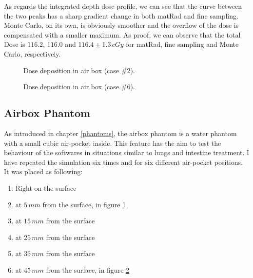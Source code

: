 \documentclass[12pt, a4paper, twoside]{book}
\begin{document}
As regards the integrated depth dose profile, we can see that the curve between the two peaks has a sharp gradient change in both matRad and fine sampling. Monte Carlo, on its own, is obviously smoother and the overflow of the dose is compensated with a smaller maximum. As proof, we can observe that the total Dose is $116.2$, $116.0$ and $116.4\pm1.3\,cGy$ for matRad, fine sampling and Monte Carlo, respectively.

\newpage

\begin{figure}[!t]
\centering
{}\quad
{}\quad
{}\quad
\caption{Dose deposition in air box (case \#2).}
\label{fig:AB2}
\end{figure}


\begin{figure}[!t]
\centering
{}\quad
{}\quad
{}\quad
\caption{Dose deposition in air box (case \#6).}
\label{fig:AB6}
\end{figure}

\subsection{Airbox Phantom}\label{air}
As introduced in chapter \ref{phantoms}, the airbox phantom is a water phantom with a small cubic air-pocket inside. This feature has the aim to test the behaviour of the softwares in situations similar to lungs and intestine treatment. 
I have repeated the simulation six times and for six different air-pocket positions. It was placed as following:

\begin{enumerate}
\item Right on the surface
\item at $5\,mm$ from the surface, in figure \ref{fig:AB2}
\item at $15\,mm$ from the surface
\item at $25\,mm$ from the surface
\item at $35\,mm$ from the surface
\item at $45\,mm$ from the surface, in figure \ref{fig:AB6}
\end{enumerate}
\end{document}
